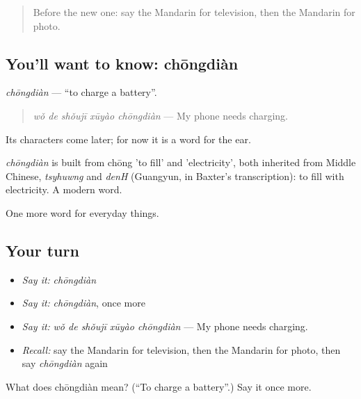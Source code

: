 \label{lesson:ZH-C109-chongdian}



\begin{quote}
Before the new one: say the Mandarin for television, then the Mandarin for photo.
\end{quote}

\subsection*{You'll want to know: chōngdiàn}
\emph{chōngdiàn} — \textquotedblleft{}to charge a battery\textquotedblright{}.

\begin{quote}
\emph{wǒ de shǒujī xūyào chōngdiàn} — My phone needs charging.
\end{quote}

Its characters come later; for now it is a word for the ear.

\begin{cousinweb}
\emph{chōngdiàn} is built from chōng 'to fill' and  'electricity', both inherited from Middle Chinese, \emph{tsyhuwng} and \emph{denH} (Guangyun, in Baxter's transcription): to fill with electricity. A modern word.
\end{cousinweb}

\begin{grammarlens}[title={What you've built}]
One more word for everyday things.
\end{grammarlens}

\subsection*{Your turn}
\begin{itemize}
\raggedright
  \item \emph{Say it:} \emph{chōngdiàn}
  \item \emph{Say it:} \emph{chōngdiàn}, once more
  \item \emph{Say it:} \emph{wǒ de shǒujī xūyào chōngdiàn} — My phone needs charging.
  \item \emph{Recall:} say the Mandarin for television, then the Mandarin for photo, then say \emph{chōngdiàn} again
\end{itemize}

\begin{tcolorbox}[breakable,colback=teal!4,colframe=teal!35!black,title={Before you move on}]
What does chōngdiàn mean? (\textquotedblleft{}To charge a battery\textquotedblright{}.) Say it once more.
\end{tcolorbox}
